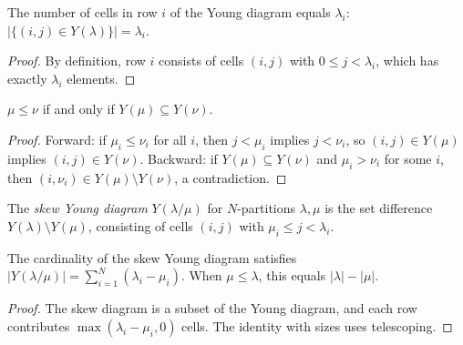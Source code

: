 \begin{lemma}
\label{lem.sf.Npar-youngDiagram-row}
\leanhelper
\leanok
The number of cells in row $i$ of the Young diagram equals $\lambda_i$:
$|\{(i, j) \in Y(\lambda)\}| = \lambda_i$.
\end{lemma}

\begin{proof}
\leanok
By definition, row $i$ consists of cells $(i, j)$ with $0 \leq j < \lambda_i$,
which has exactly $\lambda_i$ elements.
\end{proof}

\begin{lemma}
\label{lem.sf.Npar-le-iff-youngDiagram}
\leanhelper
\leanok
$\mu \leq \nu$ if and only if $Y(\mu) \subseteq Y(\nu)$.
\end{lemma}

\begin{proof}
\leanok
Forward: if $\mu_i \leq \nu_i$ for all $i$, then $j < \mu_i$ implies $j < \nu_i$,
so $(i,j) \in Y(\mu)$ implies $(i,j) \in Y(\nu)$.
Backward: if $Y(\mu) \subseteq Y(\nu)$ and $\mu_i > \nu_i$ for some $i$,
then $(i, \nu_i) \in Y(\mu) \setminus Y(\nu)$, a contradiction.
\end{proof}

\begin{definition}
\label{def.sf.Npar-skewYoungDiagram}
\leanhelper
\leanok
The \emph{skew Young diagram} $Y(\lambda/\mu)$ for $N$-partitions $\lambda, \mu$
is the set difference $Y(\lambda) \setminus Y(\mu)$, consisting of cells $(i, j)$
with $\mu_i \leq j < \lambda_i$.
\end{definition}

\begin{lemma}
\label{lem.sf.Npar-skewYoungDiagram-card}
\leanhelper
\leanok
The cardinality of the skew Young diagram satisfies
$|Y(\lambda/\mu)| = \sum_{i=1}^N (\lambda_i - \mu_i)$.
When $\mu \leq \lambda$, this equals $|\lambda| - |\mu|$.
\end{lemma}

\begin{proof}
\leanok
The skew diagram is a subset of the Young diagram, and each row contributes
$\max(\lambda_i - \mu_i, 0)$ cells. The identity with sizes uses telescoping.
\end{proof}

